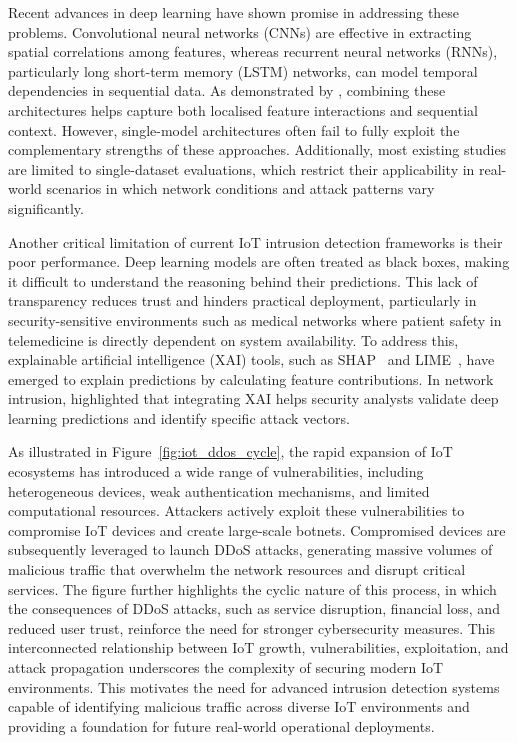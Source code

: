 \documentclass[a4paper,fleqn]{cas-sc}
\begin{document}
Recent advances in deep learning have shown promise in addressing these problems. Convolutional neural networks (CNNs) are effective in extracting spatial correlations among features, whereas recurrent neural networks (RNNs), particularly long short-term memory (LSTM) networks, can model temporal dependencies in sequential data. As demonstrated by \cite{yan2023deep}, combining these architectures helps capture both localised feature interactions and sequential context. However, single-model architectures often fail to fully exploit the complementary strengths of these approaches. Additionally, most existing studies are limited to single-dataset evaluations, which restrict their applicability in real-world scenarios in which network conditions and attack patterns vary significantly.

Another critical limitation of current IoT intrusion detection frameworks is their poor performance. Deep learning models are often treated as black boxes, making it difficult to understand the reasoning behind their predictions. This lack of transparency reduces trust and hinders practical deployment, particularly in security-sensitive environments such as medical networks where patient safety in telemedicine is directly dependent on system availability. To address this, explainable artificial intelligence (XAI) tools, such as SHAP~\citep{lundberg2017unified} and LIME~\citep{ribeiro2016why}, have emerged to explain predictions by calculating feature contributions. In network intrusion, \cite{hnamte2024iot} highlighted that integrating XAI helps security analysts validate deep learning predictions and identify specific attack vectors.

As illustrated in Figure~\ref{fig:iot_ddos_cycle}, the rapid expansion of IoT ecosystems has introduced a wide range of vulnerabilities, including heterogeneous devices, weak authentication mechanisms, and limited computational resources. Attackers actively exploit these vulnerabilities to compromise IoT devices and create large-scale botnets. Compromised devices are subsequently leveraged to launch DDoS attacks, generating massive volumes of malicious traffic that overwhelm the network resources and disrupt critical services. The figure further highlights the cyclic nature of this process, in which the consequences of DDoS attacks, such as service disruption, financial loss, and reduced user trust, reinforce the need for stronger cybersecurity measures. This interconnected relationship between IoT growth, vulnerabilities, exploitation, and attack propagation underscores the complexity of securing modern IoT environments. This motivates the need for advanced intrusion detection systems capable of identifying malicious traffic across diverse IoT environments and providing a foundation for future real-world operational deployments.
\end{document}

